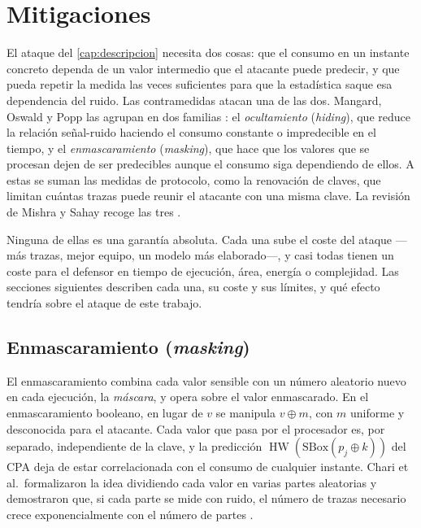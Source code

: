 \chapter{Mitigaciones}
\label{cap:mitigaciones}

El ataque del \cref{cap:descripcion} necesita dos cosas: que el consumo en un
instante concreto dependa de un valor intermedio que el atacante puede predecir,
y que pueda repetir la medida las veces suficientes para que la estadística
saque esa dependencia del ruido. Las contramedidas atacan una de las dos.
Mangard, Oswald y Popp las agrupan en dos familias \cite{mangard2007power}: el
\emph{ocultamiento} (\emph{hiding}), que reduce la relación señal-ruido haciendo
el consumo constante o impredecible en el tiempo, y el \emph{enmascaramiento}
(\emph{masking}), que hace que los valores que se procesan dejen de ser
predecibles aunque el consumo siga dependiendo de ellos. A estas se suman las
medidas de protocolo, como la renovación de claves, que limitan cuántas trazas
puede reunir el atacante con una misma clave. La revisión de Mishra y Sahay
recoge las tres \cite[secs.~II.C.5 y III.D]{mishra2025modern}.

Ninguna de ellas es una garantía absoluta. Cada una sube el coste del ataque
---más trazas, mejor equipo, un modelo más elaborado---, y casi todas tienen un
coste para el defensor en tiempo de ejecución, área, energía o complejidad.
Las secciones siguientes describen cada una, su coste y sus límites, y qué
efecto tendría sobre el ataque de este trabajo.

\section{Enmascaramiento (\emph{masking})}
\label{sec:masking}

El enmascaramiento combina cada valor sensible con un número aleatorio nuevo en
cada ejecución, la \emph{máscara}, y opera sobre el valor enmascarado. En el
enmascaramiento booleano, en lugar de $v$ se manipula $v \oplus m$, con $m$
uniforme y desconocida para el atacante. Cada valor que pasa por el procesador
es, por separado, independiente de la clave, y la predicción
$\operatorname{HW}(\mathrm{SBox}(p_j \oplus k))$ del CPA deja de estar
correlacionada con el consumo de cualquier instante. Chari et al.\ formalizaron
la idea dividiendo cada valor en varias partes aleatorias y demostraron que, si
cada parte se mide con ruido, el número de trazas necesario crece
exponencialmente con el número de partes \cite{chari1999masking}.

